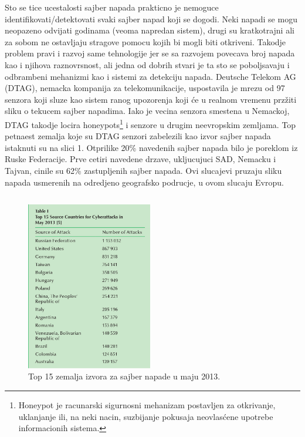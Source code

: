 \documentclass[a4paper]{article}
\begin{document}
{Sto se tice ucestalosti sajber napada prakticno je nemoguce identifikovati/detektovati svaki sajber napad koji se dogodi.
Neki napadi se mogu neopazeno odvijati godinama (veoma napredan sistem), drugi su kratkotrajni ali za sobom ne ostavljaju stragove pomocu kojih bi mogli biti otkriveni.
Takodje problem pravi i razvoj same tehnologije jer se sa razvojem povecava broj napada kao i njihova raznovrsnost, ali jedna od dobrih stvari je ta sto se poboljsavaju i odbrambeni mehanizmi kao i sistemi za detekciju napada.  
Deutsche Telekom AG (DTAG), nemacka kompanija za telekomunikacije, uspostavila je mrezu od 97 senzora koji
sluze kao sistem ranog upozorenja koji će u realnom vremenu przžiti sliku o tekucem sajber napadima. 
Iako je vecina senzora smestena u Nemackoj, DTAG takodje locira honeypots\footnote{Honeypot je racunarski sigurnosni mehanizam postavljen za otkrivanje, uklanjanje ili, na neki nacin, suzbijanje pokusaja neovlasćene upotrebe informacionih sistema.
} 
i senzore u drugim neevropskim zemljama.
\newline
Top petnaest zemalja koje su DTAG senzori zabelezili kao izvor sajber napada istaknuti su na slici 1. 
Otprilike 20\% navedenih sajber napada bilo je poreklom iz Ruske Federacije. 
Prve cetiri navedene drzave, ukljucujuci SAD, Nemacku i Tajvan, cinile su 62\% zastupljenih sajber napada.
Ovi slucajevi pruzaju sliku napada usmerenih na odredjeno geografsko podrucje, u ovom slucaju Evropu.
 


\begin{verbatim}
\end{verbatim}

\begin{figure}[h!]
  \centering
  \begin{center}
  \includegraphics[width=55mm]{slika1.jpg}
  \end{center}
  \caption{Top 15 zemalja izvora za sajber napade u maju 2013. \cite{Overview of current cyber attacks}}
  \label{fig:vr1}
\end{figure}

}
\end{document}
